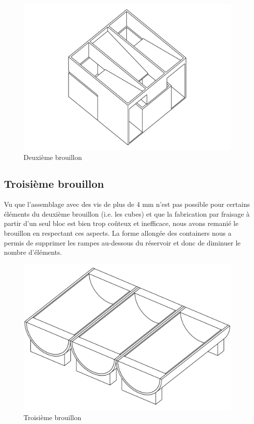 \begin{figure}
    \centering
    \includegraphics[width=\textwidth]{Graphics/Reservoir_final/DEUXIEME_BROUILLON.pdf}
    \caption{Deuxième brouillon}
    \label{fig:B2}
\end{figure}

\subsection{Troisième brouillon}
Vu que l'assemblage avec des vis de plus de 4 mm n'est pas possible pour certains éléments du deuxième brouillon (i.e. les cubes) et que la fabrication par fraisage à partir d'un seul bloc est bien trop coûteux et inefficace, nous avons remanié le brouillon en respectant ces aspects. La forme allongée des containers nous a permis de supprimer les rampes au-dessous du réservoir et donc de diminuer le nombre d'éléments.

\begin{figure}
    \centering
    \includegraphics[width=\textwidth]{Graphics/Reservoir_final/TROISIEME_BROUILLON.pdf}
    \caption{Troisième brouillon}
\end{figure}

